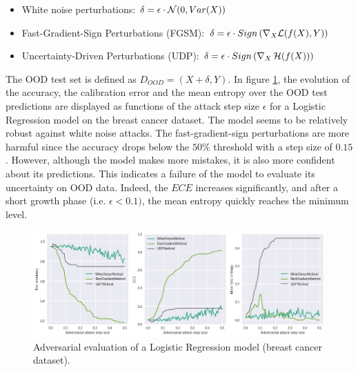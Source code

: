 \begin{itemize}
    \item White noise perturbations: $\delta = \epsilon \cdot \mathcal{N}(0, Var(X))$
    \item Fast-Gradient-Sign Perturbations\cite{FGSM} (FGSM): $\delta = \epsilon \cdot Sign\left(\nabla_X \mathcal{L}(f(X), Y)\right)$
    \item Uncertainty-Driven Perturbations\cite{UDP} (UDP): $\delta = \epsilon \cdot Sign\left(\nabla_X \operatorname{\mathcal{H}}(f(X)) \right)$
\end{itemize}

The OOD test set is defined as $D_{OOD} = (X + \delta, Y)$. In figure \ref{fig:adversarial-evaluation}, the evolution of the accuracy, the calibration error and the mean entropy over the OOD test predictions are displayed as functions of the attack step size $\epsilon$ for a Logistic Regression model on the breast cancer dataset. The model seems to be relatively robust against white noise attacks. The fast-gradient-sign perturbations are more harmful since the accuracy drops below the $50\%$ threshold with a step size of $0.15$. However, although the model makes more mistakes, it is also more confident about its predictions. This indicates a failure of the model to evaluate its uncertainty on OOD data. Indeed, the $ECE$ increases significantly, and after a short growth phase (i.e. $\epsilon < 0.1)$, the mean entropy quickly reaches the minimum level.
\begin{figure}
    \centering
    \includegraphics[width=\linewidth]{figures/eval/eval_adv_uq.png}
    \caption{Adversarial evaluation of a Logistic Regression model (breast cancer dataset).}
    \label{fig:adversarial-evaluation}
\end{figure}

